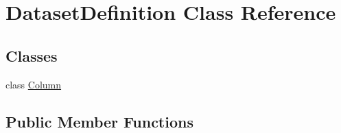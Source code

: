 \hypertarget{class_dataset_definition}{}\section{Dataset\+Definition Class Reference}
\label{class_dataset_definition}
\subsection*{Classes}
\begin{DoxyCompactItemize}
\item 
class \hyperlink{class_dataset_definition_1_1_column}{Column}
\end{DoxyCompactItemize}
\subsection*{Public Member Functions}
